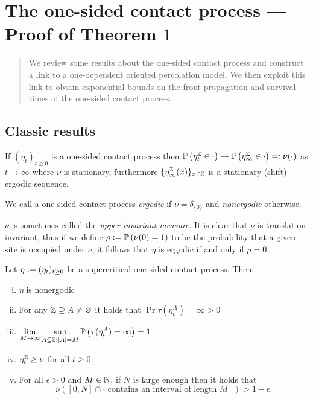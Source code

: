 \section{The one-sided contact process --- Proof of Theorem $1$}
\label{sec:contact}

\begin{quote}
{\small We review some results about the one-sided contact process and construct a link to a one-dependent oriented percolation model. We then exploit this link to obtain exponential bounds on the front propagation and survival times of the one-sided contact process. }
\end{quote}

\subsection{Classic results}

\begin{theorem}\label{thm:upper_invariant}
If $(\eta_t)_{t \geq 0}$ is a one-sided contact process then $\mathbb{P} \left( \eta^{\mathbb{Z}}_t \in \cdot \right) \rightharpoonup \mathbb{P} \left( \eta^{\mathbb{Z}}_\infty \in \cdot \right) =\vcentcolon \nu(\cdot)$ as $t \to \infty$ where $\nu$ is stationary, furthermore $\{ \eta^{\mathbb{Z}}_\infty (x) \}_{x \in \mathbb{Z}}$ is a stationary (shift) ergodic sequence. 
\end{theorem}

\begin{definition}
We call a one-sided contact process \textit{ergodic} if $\nu = \delta_{\{0\}}$ and \textit{nonergodic} otherwise. 
\end{definition}

\begin{remark}\label{rem:positive_density}
$\nu$ is sometimes called the \textit{upper invariant measure}. It is clear that $\nu$ is translation invariant, thus if we define $\rho \vcentcolon= \mathbb{P} \left( \nu(0) = 1 \right)$ to be the probability that a given site is occupied under $\nu$, it follows that $\eta$ is ergodic if and only if $\rho = 0$. 
\end{remark}

\begin{lemma}\label{lem:old_results}
Let $\eta \vcentcolon= (\eta_t)_{t \geq 0}$ be a supercritical one-sided contact process. Then: 
\begin{enumerate}[(i)]
	\item $\eta$ is nonergodic
	\item For any $\mathbb{Z} \supseteq A \neq \varnothing$ it holds that $\Pr{\tau(\eta^A_t) = \infty} > 0$
	\item $\lim\limits_{M \rightarrow \infty} \sup\limits_{A \subseteq \mathbb{Z}: |A| = M} \mathbb{P} \left( \tau(\eta^A_t) = \infty \right) = 1$
	\item $\eta^{\mathbb{Z}}_t \geq \nu$ for all $t \geq 0$
	\item For all $\epsilon > 0$ and $M \in \mathbb{N}$, if $N$ is large enough then it holds that 
		\[\nu([0, N] \cap \cdot\text{ contains an interval of length $M$ }) > 1 - \epsilon. \]  
\end{enumerate}
\end{lemma}

